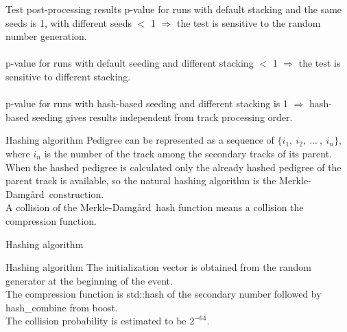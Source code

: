 \documentclass[aspectratio=169, 14pt]{beamer}
\newcommand{\MD}{Merkle-Damg\r{a}rd}
\begin{document}
\begin{large}
 \begin{frame}{Test post-processing results}
  p-value for runs with default stacking and the same seeds is 1, with different seeds $<$ 1
  $\Rightarrow$ the test is sensitive to the random number generation.\\\ \\
  p-value for runs with default seeding and different stacking $<$ 1
  $\Rightarrow$ the test is sensitive to different stacking.\\\ \\
  p-value for runs with hash-based seeding and different stacking is 1
  $\Rightarrow$ hash-based seeding gives results independent from track processing order.
 \end{frame}
 
 \begin{frame}{Hashing algorithm}
  Pedigree can be represented as a sequence of $\{i_1,\ i_2,\ ...\ ,\ i_n\}$,
  where ${i_n}$ is the number of the track among the secondary tracks of its parent.\\  
  When the hashed pedigree is calculated only the already hashed pedigree of the parent track is available,
  so the natural hashing algorithm is the \MD\ construction.\\  
  A collision of the \MD\ hash function means a collision the compression function.
 \end{frame}

 \begin{frame}{Hashing algorithm}
  \scalebox{.5}{}
 \end{frame}
 
 \begin{frame}{Hashing algorithm}
  The initialization vector is obtained from the random generator at the beginning of the event.\\  
  The compression function is std::hash of the secondary number followed by hash\_combine from boost.\\  
  The collision probability is estimated to be $2^{-64}$.
 \end{frame}
 
\end{large}
\end{document}
